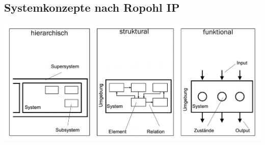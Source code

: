 \subsection{Systemkonzepte nach Ropohl \hfill IP}
\begin{footnotesize}
    \begin{center}
        \includegraphics[width = 1.0\linewidth]{MAEIP_Ropohl}
    \end{center}
\end{footnotesize}